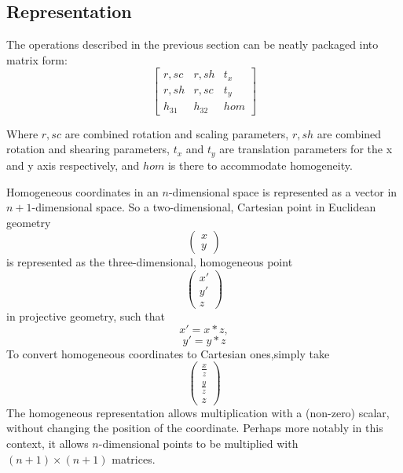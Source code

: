 \subsection{Representation}
The operations described in the previous section can be neatly packaged into
matrix form:
$$\begin{bmatrix}
	r,sc & r,sh & t_{x} \\
	r,sh & r,sc & t_{y} \\
	h_{31} & h_{32} & hom
\end{bmatrix}$$

Where $r,sc$ are combined rotation and scaling parameters, $r,sh$ are combined
rotation and shearing parameters, $t_{x}$ and $t_{y}$ are translation
parameters for the x and y axis respectively, and $hom$ is there to accommodate
homogeneity. 

Homogeneous coordinates in an $n$-dimensional space is represented as a vector
in $n+1$-dimensional space. So a two-dimensional, Cartesian point in Euclidean
geometry
$$\begin{pmatrix}
	x \\
	y
\end{pmatrix}$$
is represented as the three-dimensional, homogeneous point
$$\begin{pmatrix}
	x' \\
	y' \\
	z
\end{pmatrix}$$
in projective geometry, such that $$x'=x*z,$$$$y'=y*z$$To convert homogeneous
coordinates to Cartesian ones,simply take
$$\begin{pmatrix}
	\frac{x}{z} \\[0.3em]
	\frac{y}{z} \\[0.3em]
	z
\end{pmatrix}$$
The homogeneous representation allows multiplication with a (non-zero) scalar,
without changing the position of the coordinate. Perhaps more notably in this
context, it allows $n$-dimensional points to be multiplied with $(n+1)\times
(n+1)$ matrices.

